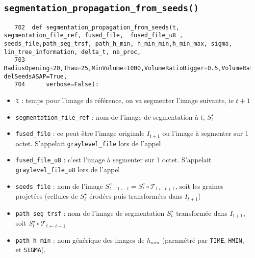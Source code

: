 \documentclass{article}
\def \mycolor {red}
\begin{document}
\subsection{\texttt{segmentation\_propagation\_from\_seeds()}}
\label{sec:segmentation:propagation:from:seeds}
\begin{verbatim}
   702	def segmentation_propagation_from_seeds(t, segmentation_file_ref, fused_file,  fused_file_u8 , seeds_file,path_seg_trsf, path_h_min, h_min_min,h_min_max, sigma, lin_tree_information, delta_t, nb_proc,
   703	    RadiusOpening=20,Thau=25,MinVolume=1000,VolumeRatioBigger=0.5,VolumeRatioSmaller=0.1,MorphosnakeIterations=10,NIterations=200,DeltaVoxels=10**3,Volum_Min_No_Seed=100, delSeedsASAP=True, 
   704	    verbose=False):
\end{verbatim} 
\color{\mycolor}
\begin{itemize}
\itemsep -0.5ex
\item \verb|t| : temps pour l'image de r\'ef\'erence, on va segmenter l'image suivante, ie $t+1$
\item \verb|segmentation_file_ref| : nom de l'image de segmentation \`a $t$, $S^{\star}_t$
\item \verb|fused_file| : ce peut \^etre l'image originale $I_{t+1}$ ou  l'image \`a segmenter sur 1 octet. S'appelait \verb|graylevel_file| lors de l'appel
\item \verb|fused_file_u8| : c'est l'image \`a segmenter sur 1 octet. S'appelait \verb|graylevel_file_u8| lors de l'appel
\item \verb|seeds_file| : nom de l'image $S^e_{t+1 \leftarrow t} = S^e_t \circ \mathcal{T}_{t \leftarrow t+1}$, soit les graines projet\'ees (cellules de $S^{\star}_t$ \'erod\'ees puis transform\'ees dans $I_{t+1}$)
\item \verb|path_seg_trsf| : nom de l'image de segmentation $S^{\star}_t$ transform\'ee dans $I_{t+1}$, soit
$S^{\star}_t \circ \mathcal{T}_{t \leftarrow t+1}$
\item \verb|path_h_min| : nom g\'en\'erique des images de $h_{min}$ (param\'etr\'e par \verb|TIME|, \verb|HMIN|, et \verb|SIGMA|),
\end{itemize}
\color{black}
\end{document}
